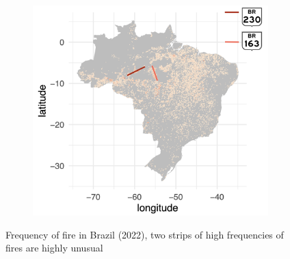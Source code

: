 \documentclass{article}\usepackage[]{graphicx}\usepackage[]{xcolor}
\newenvironment{knitrout}{}{} %
\numberwithin{equation}{section}
\begin{document}
\begin{figure}[htbp]
\begin{minipage}[b]{0.48\linewidth}
\begin{knitrout}
\end{knitrout}
  \end{minipage}
  \hfill
  \begin{minipage}[b]{0.48\linewidth}
\begin{figure}[H]
    \centering
    \includegraphics[width=1\linewidth]{image_reference/mapshoot.png}
\end{figure}
  \end{minipage}
  \caption{Frequency of fire in Brazil (2022), two strips of high frequencies of fires are highly unusual}
  \label{fig:fire22}
\end{figure}
\end{document}
